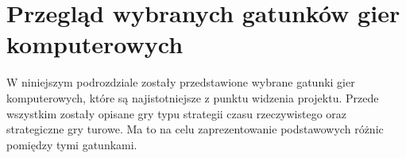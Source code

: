 \section{Przegląd wybranych gatunków gier komputerowych}
W niniejszym podrozdziale zostały przedstawione wybrane gatunki gier komputerowych, które są najistotniejsze z punktu widzenia
projektu. Przede wszystkim zostały opisane gry typu strategii czasu rzeczywistego oraz strategiczne gry turowe. Ma to na
celu zaprezentowanie podstawowych różnic pomiędzy tymi gatunkami.





